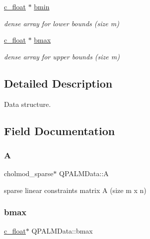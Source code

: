 \begin{DoxyCompactItemize}
\mbox{\hyperlink{global__opts_8h_a7f1a9fda95e52979658c20a0d134fb15}{c\+\_\+float}} $\ast$ \mbox{\hyperlink{structQPALMData_a60dd17db336a4267f86b0b913a82bc83}{bmin}}
\begin{DoxyCompactList}\small\item\em dense array for lower bounds (size m) \end{DoxyCompactList}\item 
\mbox{\hyperlink{global__opts_8h_a7f1a9fda95e52979658c20a0d134fb15}{c\+\_\+float}} $\ast$ \mbox{\hyperlink{structQPALMData_ab3ab1a3453ce3efaeb49e6b13fe317ed}{bmax}}
\begin{DoxyCompactList}\small\item\em dense array for upper bounds (size m) \end{DoxyCompactList}\end{DoxyCompactItemize}


\subsection{Detailed Description}
Data structure. 

\subsection{Field Documentation}
\mbox{\label{structQPALMData_abba076ae970ced06cf4b9791b87fdeb4}} 
\subsubsection{\texorpdfstring{A}{A}}
{\footnotesize\ttfamily cholmod\+\_\+sparse$\ast$ Q\+P\+A\+L\+M\+Data\+::A}



sparse linear constraints matrix A (size m x n) 

\mbox{\label{structQPALMData_ab3ab1a3453ce3efaeb49e6b13fe317ed}} 
\subsubsection{\texorpdfstring{bmax}{bmax}}
{\footnotesize\ttfamily \mbox{\hyperlink{global__opts_8h_a7f1a9fda95e52979658c20a0d134fb15}{c\+\_\+float}}$\ast$ Q\+P\+A\+L\+M\+Data\+::bmax}




